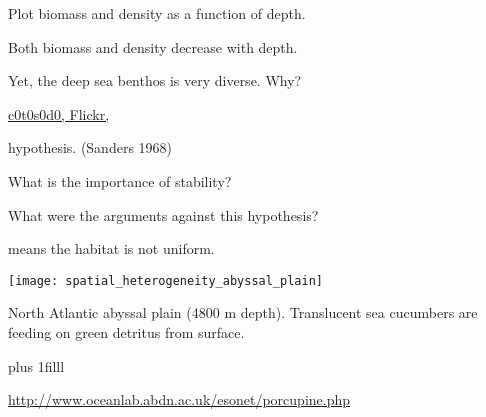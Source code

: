 \documentclass[t]{beamer}
\begin{document}
{
\begin{frame}[t]{Plot biomass and density as a function of depth.}

\end{frame}}

%

{
\begin{frame}[t]{Both biomass and density decrease with depth.}

\vspace*{10\baselineskip}

\hangpara Yet, the deep sea benthos is very diverse. Why?
\end{frame}}

%

{
\begin{frame}

\vfilll

\tiny \href{https://flickr.com/photos/c0t0s0d0/3169502387/}{c0t0s0d0, Flickr, }
\end{frame}
}

%


\begin{frame}[t]{ hypothesis. {\large (Sanders 1968)}}

	\hangpara What is the importance of stability?

	\hangpara What were the arguments against this hypothesis?

\end{frame}

%

\begin{frame}[t]{ means the habitat is not uniform.}

	{\centering
	\texttt{[image: spatial\_heterogeneity\_abyssal\_plain]}\par}

	\vspace*{-\baselineskip}\hangpara North Atlantic abyssal plain (4800 m depth). Translucent sea cucumbers are feeding on green detritus from surface.

\vskip0pt plus 1filll

\hfill\tiny\url{http://www.oceanlab.abdn.ac.uk/esonet/porcupine.php}
\end{frame}
\end{document}
